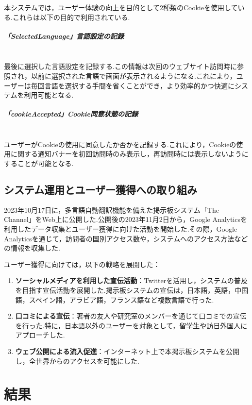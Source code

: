 \documentclass[b5paper,12pt,dvipdfmx]{jsreport}
\begin{document}
本システムでは，ユーザー体験の向上を目的として2種類のCookieを使用している.これらは以下の目的で利用されている.

\paragraph{「SelectedLanguage」言語設定の記録}\mbox{}\\
最後に選択した言語設定を記録する.この情報は次回のウェブサイト訪問時に参照され，以前に選択された言語で画面が表示されるようになる.これにより，ユーザーは毎回言語を選択する手間を省くことができ，より効率的かつ快適にシステムを利用可能となる.

\paragraph{「cookieAccepted」Cookie同意状態の記録}\mbox{}\\
ユーザーがCookieの使用に同意したか否かを記録する.これにより，Cookieの使用に関する通知バナーを初回訪問時のみ表示し，再訪問時には表示しないようにすることが可能となる.


\section{システム運用とユーザー獲得への取り組み}

2023年10月17日に，多言語自動翻訳機能を備えた掲示板システム「The Channel」をWeb上に公開した.公開後の2023年11月2日から，Google Analyticsを利用したデータ収集とユーザー獲得に向けた活動を開始した.その際，Google Analyticsを通じて，訪問者の国別アクセス数や，システムへのアクセス方法などの情報を収集した.

ユーザー獲得に向けては，以下の戦略を展開した：
\begin{enumerate}
    \item \textbf{ソーシャルメディアを利用した宣伝活動}：Twitterを活用し，システムの普及を目指す宣伝活動を展開した.掲示板システムの宣伝は，日本語，英語，中国語，スペイン語，アラビア語，フランス語など複数言語で行った.
    \item \textbf{口コミによる宣伝}：著者の友人や研究室のメンバーを通じて口コミでの宣伝を行った.特に，日本語以外のユーザーを対象として，留学生や訪日外国人にアプローチした.
    \item \textbf{ウェブ公開による流入促進}：インターネット上で本掲示板システムを公開し，全世界からのアクセスを可能にした.
\end{enumerate}

\chapter{結果}
\end{document}
